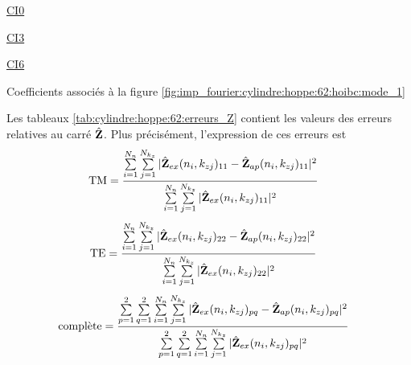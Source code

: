   \begin{table}[!hbt]
    \centering
    \begin{minipage}[t]{0.49\textwidth}
      \vspace{0pt}
      \centering
      \begin{coefftable}{\hyperlink{ci0}{CI0}}
        
      \end{coefftable}
      \begin{coefftable}{\hyperlink{ci3}{CI3}}
        
      \end{coefftable}
    \end{minipage}
    \begin{minipage}[t]{0.49\textwidth}
      \vspace{0pt}
      \centering
      \begin{coefftable}{\hyperlink{ci6}{CI6}}
        
      \end{coefftable}
    \end{minipage}
    \caption{Coefficients associés à la figure \ref{fig:imp_fourier:cylindre:hoppe:62:hoibc:mode_1}}
    \label{tab:imp_fourier:cylindre:hoppe:62:hoibc:mode_1}
  \end{table}

  Les tableaux \ref{tab:cylindre:hoppe:62:erreurs_Z} contient les valeurs des erreurs relatives au carré \(\hat{\mathbf{Z}}\). 
  Plus précisément, l'expression de ces erreurs est 
  \begin{align*}
    \text{TM} &= \dfrac{\sum\limits_{i=1}^{N_n}\sum\limits_{j=1}^{N_{k_z}}|\hat{\mathbf{Z}}_{ex}(n_i,k_{zj})_{11}-\hat{\mathbf{Z}}_{ap}(n_i,k_{zj})_{11}|^2}{\sum\limits_{i=1}^{N_n}\sum\limits_{j=1}^{N_{k_z}}|\hat{\mathbf{Z}}_{ex}(n_i,k_{zj})_{11}|^2}
  \end{align*}
  \begin{align*}
    \text{TE} &= \dfrac{\sum\limits_{i=1}^{N_n}\sum\limits_{j=1}^{N_{k_z}}|\hat{\mathbf{Z}}_{ex}(n_i,k_{zj})_{22}-\hat{\mathbf{Z}}_{ap}(n_i,k_{zj})_{22}|^2}{\sum\limits_{i=1}^{N_n}\sum\limits_{j=1}^{N_{k_z}}|\hat{\mathbf{Z}}_{ex}(n_i,k_{zj})_{22}|^2}
  \end{align*}
  \begin{align*}
    \text{complète}  &= \dfrac{\sum\limits_{p=1}^2\sum\limits_{q=1}^2\sum\limits_{i=1}^{N_n}\sum\limits_{j=1}^{N_{k_z}}|\hat{\mathbf{Z}}_{ex}(n_i,k_{zj})_{pq}-\hat{\mathbf{Z}}_{ap}(n_i,k_{zj})_{pq}|^2}{\sum\limits_{p=1}^2\sum\limits_{q=1}^2\sum\limits_{i=1}^{N_n}\sum\limits_{j=1}^{N_{k_z}}|\hat{\mathbf{Z}}_{ex}(n_i,k_{zj})_{pq}|^2}
  \end{align*}

